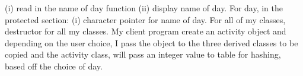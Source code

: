 \documentclass[11pt, a4paper]{article}
\begin{document}
(i) read in the name of day function (ii) display name of day. For day, in the protected section: (i) character pointer for name of day. For all of my classes, destructor for all my classes. My client program create an activity object and depending on the user choice, I pass the object to the three derived classes to be copied and the activity class, will pass an integer value to table for hashing, based off the choice of day.
\end{document}
